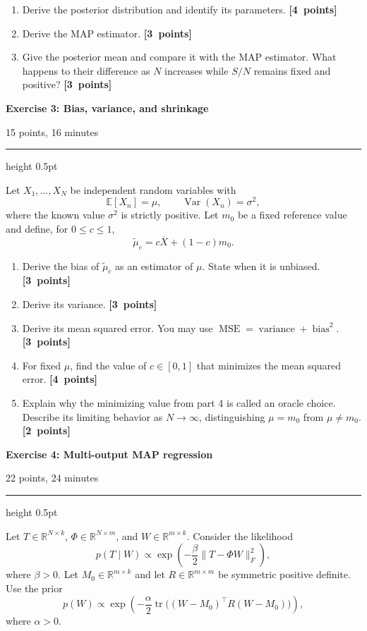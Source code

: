 \documentclass[11pt,a4paper]{article}
\newcommand{\points}[1]{\unskip\nobreak\hfill\mbox{\textbf{[#1 points]}}}
\newcommand{\exercise}[3]{%
  \Needspace{8\baselineskip}%
  \par\addvspace{1.1em}%
  \noindent
  \begin{minipage}[t]{0.73\textwidth}
    \vspace{0pt}\raggedright\large\bfseries\color{examblue}
    Exercise #1: #2
  \end{minipage}\hfill
  \begin{minipage}[t]{0.24\textwidth}
    \vspace{0pt}\raggedleft\small\color{examblue}#3
  \end{minipage}%
  \par\nobreak\vspace{0.2em}%
  {\color{rulegray}\hrule height 0.5pt}%
  \vspace{0.55em}%
}
\begin{document}
\begin{enumerate}[resume]
  \item Derive the posterior distribution and identify its parameters. \points{4}
  \item Derive the MAP estimator. \points{3}
  \item Give the posterior mean and compare it with the MAP estimator. What happens to their difference as $N$ increases while $S/N$ remains fixed and positive? \points{3}
\end{enumerate}

\exercise{3}{Bias, variance, and shrinkage}{15 points, 16 minutes}

Let $X_1,\ldots,X_N$ be independent random variables with
\[
  \mathbb{E}[X_n]=\mu,
  \qquad
  \operatorname{Var}(X_n)=\sigma^2,
\]
where the known value $\sigma^2$ is strictly positive. Let $m_0$ be a fixed reference value and define, for $0\leq c\leq 1$,
\[
  \widetilde{\mu}_c=c\overline{X}+(1-c)m_0.
\]

\begin{enumerate}
  \item Derive the bias of $\widetilde{\mu}_c$ as an estimator of $\mu$. State when it is unbiased. \points{3}
  \item Derive its variance. \points{3}
  \item Derive its mean squared error. You may use $\operatorname{MSE}=\operatorname{variance}+\operatorname{bias}^2$. \points{3}
  \item For fixed $\mu$, find the value of $c\in[0,1]$ that minimizes the mean squared error. \points{4}
  \item Explain why the minimizing value from part 4 is called an oracle choice. Describe its limiting behavior as $N\to\infty$, distinguishing $\mu=m_0$ from $\mu\neq m_0$. \points{2}
\end{enumerate}

\exercise{4}{Multi-output MAP regression}{22 points, 24 minutes}

Let $T\in\mathbb{R}^{N\times k}$, $\Phi\in\mathbb{R}^{N\times m}$, and $W\in\mathbb{R}^{m\times k}$. Consider the likelihood
\[
  p(T\mid W)\propto
  \exp\left(-\frac{\beta}{2}\lVert T-\Phi W\rVert_F^2\right),
\]
where $\beta>0$. Let $M_0\in\mathbb{R}^{m\times k}$ and let $R\in\mathbb{R}^{m\times m}$ be symmetric positive definite. Use the prior
\[
  p(W)\propto
  \exp\left(-\frac{\alpha}{2}
  \operatorname{tr}\bigl((W-M_0)^\top R(W-M_0)\bigr)\right),
\]
where $\alpha>0$.
\end{document}
